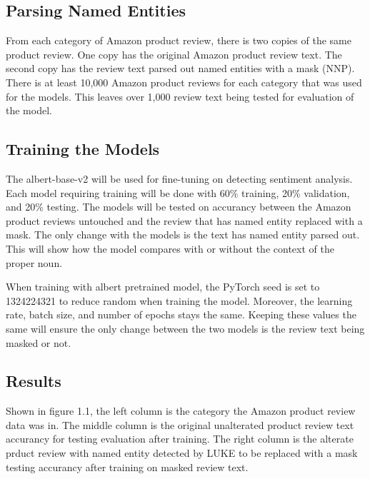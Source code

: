 \documentclass[11pt,a4paper]{article}
\begin{document}
\subsection{Parsing Named Entities}

From each category of Amazon product review, there is two copies of the same product review. One copy has the original Amazon product review text. The second copy has the review text parsed out named entities with a mask (NNP). There is at least 10,000 Amazon product reviews for each category that was used for the models. This leaves over 1,000 review text being tested for evaluation of the model.

\subsection{Training the Models}

The albert-base-v2 will be used for fine-tuning on detecting sentiment analysis. Each model requiring training will be done with 60\% training, 20\% validation, and 20\% testing. The models will be tested on accurancy between the Amazon product reviews untouched and the review that has named entity replaced with a mask. The only change with the models is the text has named entity parsed out. This will show how the model compares with or without the context of the proper noun.

When training with albert pretrained model, the PyTorch seed is set to 1324224321 to reduce random when training the model. Moreover, the learning rate, batch size, and number of epochs stays the same. Keeping these values the same will ensure the only change between the two models is the review text being masked or not.

\subsection{Results}

Shown in figure 1.1, the left column is the category the Amazon product review data was in. The middle column is the original unalterated product review text accurancy for testing evaluation after training. The right column is the alterate prduct review with named entity detected by LUKE to be replaced with a mask testing accurancy after training on masked review text. \\
\end{document}
